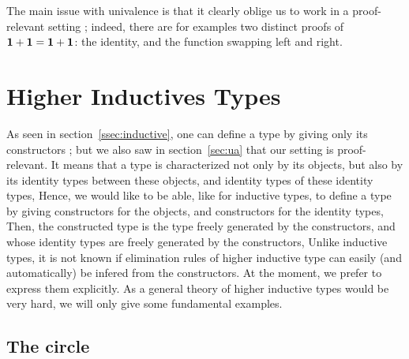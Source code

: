 The main issue with univalence is that it clearly oblige us to work in
a proof-relevant setting ; indeed, there are for examples two distinct
proofs of $\mathbf{1}+\mathbf{1} = \mathbf{1}+\mathbf{1}$: the identity, and the function
swapping left and right.

\section{Higher Inductives Types}
\label{sec:hit}

As seen in section~\ref{ssec:inductive}, one can define a type by
giving only its constructors ; but we also saw in section~\ref{sec:ua}
that our setting is proof-relevant. It means that a type is
characterized not only by its objects, but also by its identity types
between these objects, and identity types of these identity types,
\etc{}
Hence, we would like to be able, like for inductive types, to define a
type by giving constructors for the objects, and constructors for the
identity types, \etc{} Then, the constructed type is the type freely
generated by the constructors, and whose identity types are freely
generated by the constructors, \etc{}
Unlike inductive types, it is not known if elimination rules of higher
inductive type can easily (and automatically) be infered from the
constructors. At the moment, we prefer to express them
explicitly. As a general theory of higher inductive types would be
very hard, we will only give some fundamental examples.


\subsection{The circle}
\label{ssec:S1}

